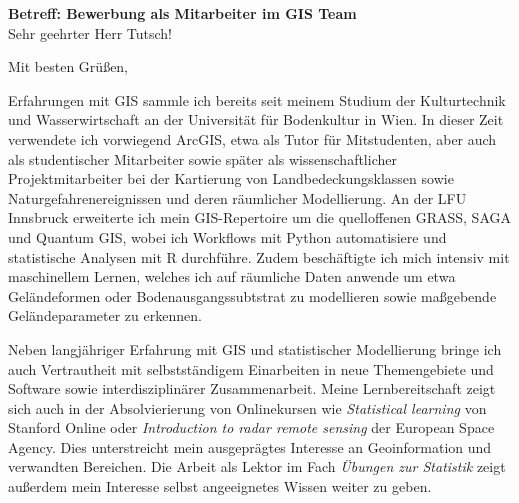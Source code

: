 \documentclass[11pt,a4paper,sans]{moderncv}        %
\begin{document}

\date{15. Dezember 2017}
\opening{\textbf{Betreff: Bewerbung als Mitarbeiter im GIS Team} \\[0.5cm]     Sehr geehrter Herr Tutsch!}
\closing{Mit besten Gr\"{u}{\ss}en,}

\makelettertitle
\justify
\vspace{-0.5cm} %

Erfahrungen mit GIS sammle ich bereits seit meinem Studium der Kulturtechnik und Wasserwirtschaft an der Universit\"at f\"ur Bodenkultur in Wien. In dieser Zeit verwendete ich vorwiegend ArcGIS, etwa als Tutor f\"ur Mitstudenten, aber auch als studentischer Mitarbeiter sowie sp\"ater als wissenschaftlicher Projektmitarbeiter bei der Kartierung von Landbedeckungsklassen sowie Naturgefahrenereignissen und deren r\"aumlicher Modellierung. An der LFU Innsbruck erweiterte ich mein GIS-Repertoire um die quelloffenen GRASS, SAGA und Quantum GIS, wobei ich Workflows mit Python automatisiere und statistische Analysen mit R durchf\"uhre. Zudem besch\"aftigte ich mich intensiv mit maschinellem Lernen, welches ich auf r\"aumliche Daten anwende um etwa Gel\"andeformen oder Bodenausgangssubtstrat zu modellieren sowie ma{\ss}gebende Gel\"andeparameter zu erkennen. 

Neben langj\"ahriger Erfahrung mit GIS und statistischer Modellierung bringe ich auch Vertrautheit mit selbstst\"andigem Einarbeiten in neue Themengebiete und Software sowie interdisziplin\"arer Zusammenarbeit. Meine Lernbereitschaft zeigt sich auch in der  Absolvierierung von Onlinekursen wie \emph{Statistical learning} von Stanford Online oder \emph{Introduction to radar remote sensing} der European Space Agency. Dies unterstreicht mein ausgepr\"agtes Interesse an Geoinformation und verwandten Bereichen. Die Arbeit als Lektor im Fach \emph{\"Ubungen zur Statistik} zeigt au{\ss}erdem mein Interesse selbst angeeignetes Wissen weiter zu geben.
\end{document}
